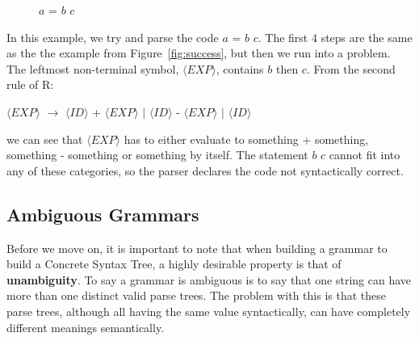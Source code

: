 \documentclass[ %
                    author={Jonathan Rankin},
                supervisor={Dr. David May, Dr. Ian Holyer},
                    degree={MEng},
                     title={CodeTouch},
                  subtitle={A Revolutionary Way To Program Real Code On Touch Screen Devices},
                      type={enterprise},
                      year={2015 } ]{dissertation}
\begin{document}
\begin{itemize}
\begin{figure}[h]
\begin{subfigure}{.5\textwidth}
\end{subfigure}
\caption{$a$ = $b$ $c$}
\label{fig:test}
\end{figure}

In this example, we try and parse the code $a$ = $b$ $c$. The first 4 steps are the same as the the example from Figure~\ref{fig:success}, but then we run into a problem. The leftmost non-terminal symbol,  $\langle EXP \rangle $, contains $b$ then $c$. From the second rule of R:

\begin{center}
$\langle EXP \rangle$ $\rightarrow$  $\langle ID \rangle$ + $\langle EXP \rangle$  $|$  $\langle ID \rangle$ - $\langle EXP \rangle$ $|$ $\langle ID \rangle$ 
\end{center}

we can see that $\langle EXP \rangle$ has to either evaluate to something + something, something - something or something by itself. The statement $b$ $c$ cannot fit into any of these categories, so the parser declares the code not syntactically correct. 


\end{itemize}


\subsection{Ambiguous Grammars}
Before we move on, it is important to note that when building a grammar to build a Concrete Syntax Tree, a highly desirable property is that of \textbf{unambiguity}. To say a grammar is ambiguous is to say that one string can have more than one distinct valid parse trees. The problem with this is that these parse trees, although all having the same value syntactically, can have completely different meanings semantically. 
\end{document}
